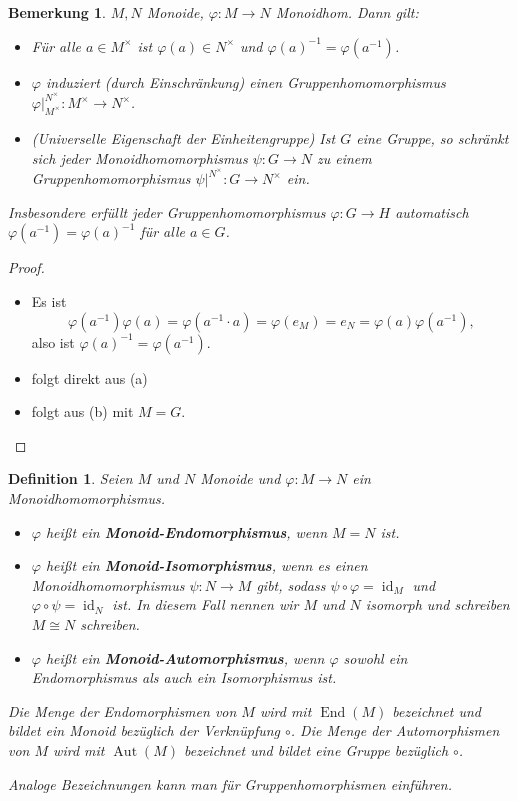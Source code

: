 \documentclass[a4paper, twoside, 11pt, ngerman]{report}
\DeclareMathOperator{\Aut}{Aut}
\DeclareMathOperator{\End}{End}
\DeclareMathOperator{\ident}{id}
\theoremstyle{definistyle}
\newtheorem{defini}[satz]{Definition}
\newtheorem{bem}[satz]{Bemerkung}
\theoremstyle{remark}
\newcommand{\defn}[1]{\textit{\bfseries #1}}
\begin{document}
\begin{bem}\label{bem:gruppenhom_universelle_eigenschaft}
$ M, N $ Monoide, $ \varphi: M \to N $ Monoidhom. Dann gilt:
\begin{itemize}
    \item[(a)] Für alle $ a \in M^{\times} $ ist $ \varphi(a) \in N^{\times} $ und $ \varphi(a)^{-1} = \varphi(a^{-1}) $.
    \item[(b)] $ \varphi $ induziert (durch Einschränkung) einen Gruppenhomomorphismus $ \varphi|_{M^{\times}}^{N^{\times}}: M^{\times} \to N^{\times} $.
    \item[(c)] (Universelle Eigenschaft der Einheitengruppe) Ist $ G $ eine Gruppe, so schränkt sich jeder Monoidhomomorphismus $ \psi: G \to N $ zu einem Gruppenhomomorphismus $\psi|^{N^{\times}}\colon G\to N^{\times}$ ein. 
\end{itemize}
Insbesondere erfüllt jeder Gruppenhomomorphismus $ \varphi: G \to H $ automatisch $ \varphi(a^{-1}) = \varphi(a)^{-1} $ für alle $ a \in G $.
\end{bem}

\begin{proof}
\begin{itemize}
    \item[(a)] Es ist \[\varphi(a^{-1}) \varphi(a) = \varphi(a^{-1} \cdot a) = \varphi(e_M) = e_N=\varphi(a)\varphi(a^{-1}),\] also ist $\varphi(a)^{-1} = \varphi(a^{-1})$.
    \item[(b)] folgt direkt aus (a)
    \item[(c)] folgt aus (b) mit $M=G$.
\end{itemize}
\end{proof}


\begin{defini}\label{def:monoid_endo_und_automorphismus}
Seien $ M $ und $ N $ Monoide und $ \varphi: M \to N $ ein Monoidhomomorphismus.
\begin{itemize}
    \item $ \varphi $ heißt ein \defn{Monoid-Endomorphismus}, wenn $ M = N $ ist.
    \item $ \varphi $ heißt ein \defn{Monoid-Isomorphismus}, wenn es einen Monoidhomomorphismus $ \psi: N \to M $ gibt, sodass $ \psi \circ \varphi = \ident_M $ und $ \varphi \circ \psi = \ident_N $ ist. In diesem Fall nennen wir $ M $ und $ N $ isomorph und schreiben $ M \cong N $ schreiben.
    \item $ \varphi $ heißt ein \defn{Monoid-Automorphismus}, wenn $ \varphi $ sowohl ein Endomorphismus als auch ein Isomorphismus ist.
\end{itemize}
Die Menge der Endomorphismen von $ M $ wird mit $ \End(M) $ bezeichnet und bildet ein Monoid bezüglich der Verknüpfung $ \circ $. Die Menge der Automorphismen von $ M $ wird mit $ \Aut(M) $ bezeichnet und bildet eine Gruppe bezüglich $ \circ $. 

Analoge Bezeichnungen kann man für Gruppenhomorphismen einführen.
\end{defini}
\end{document}
